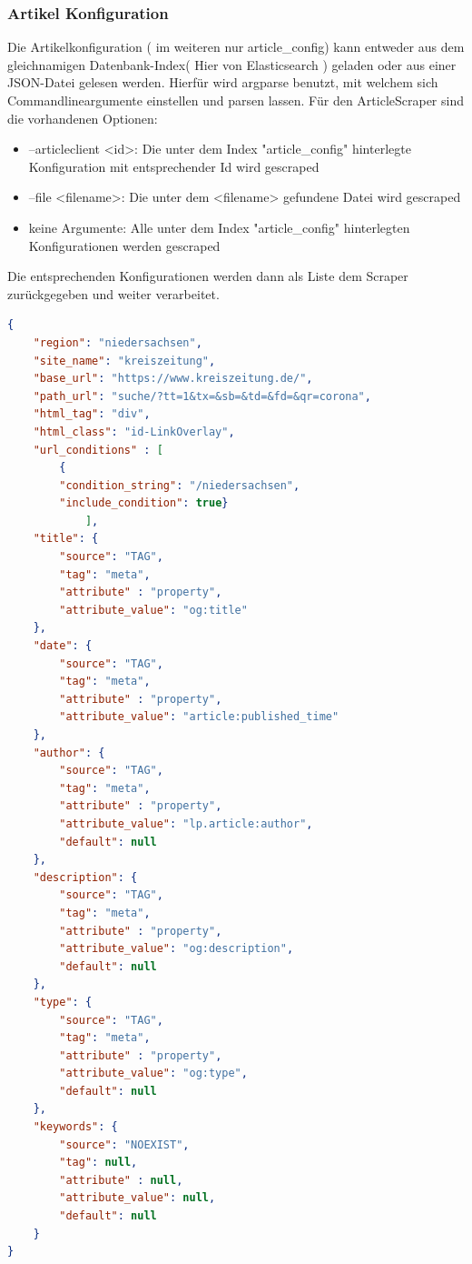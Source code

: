 \documentclass[12pt,oneside,a4paper,parskip]{scrbook}
\begin{document}
\subsubsection{Artikel Konfiguration}
Die Artikelkonfiguration ( im weiteren nur article\_config) kann entweder aus dem gleichnamigen Datenbank-Index( Hier von  Elasticsearch ) geladen oder aus einer JSON-Datei gelesen werden. Hierfür wird argparse benutzt, mit welchem sich Commandlineargumente einstellen und parsen lassen. Für den ArticleScraper sind die vorhandenen Optionen:
\begin{itemize}
\item --articleclient <id>: Die unter dem Index "article\_config" hinterlegte Konfiguration mit entsprechender Id wird gescraped
\item --file <filename>: Die unter dem <filename> gefundene Datei wird gescraped
\item keine Argumente: Alle unter dem Index "article\_config" hinterlegten Konfigurationen werden gescraped
\end{itemize}

Die entsprechenden Konfigurationen werden dann als Liste dem Scraper zurückgegeben und weiter verarbeitet.
\begin{lstlisting}[caption=article\_config am Beispiel Niedersachsen,label=articleconfig,language=json]
{
    "region": "niedersachsen",
    "site_name": "kreiszeitung",
    "base_url": "https://www.kreiszeitung.de/",
    "path_url": "suche/?tt=1&tx=&sb=&td=&fd=&qr=corona",
    "html_tag": "div",
    "html_class": "id-LinkOverlay",
    "url_conditions" : [
        {
        "condition_string": "/niedersachsen",
        "include_condition": true}
        	],
    "title": {
        "source": "TAG",
        "tag": "meta",
        "attribute" : "property",
        "attribute_value": "og:title"
    },
    "date": {
        "source": "TAG",
        "tag": "meta",
        "attribute" : "property",
        "attribute_value": "article:published_time"
    },
    "author": {
        "source": "TAG",
        "tag": "meta",
        "attribute" : "property",
        "attribute_value": "lp.article:author",
        "default": null
    },
    "description": {
        "source": "TAG",
        "tag": "meta",
        "attribute" : "property",
        "attribute_value": "og:description",
        "default": null
    },
    "type": {
        "source": "TAG",
        "tag": "meta",
        "attribute" : "property",
        "attribute_value": "og:type",
        "default": null
    },
    "keywords": {
        "source": "NOEXIST",
        "tag": null,
        "attribute" : null,
        "attribute_value": null,
        "default": null
    }
} 
\end{lstlisting}
\end{document}
